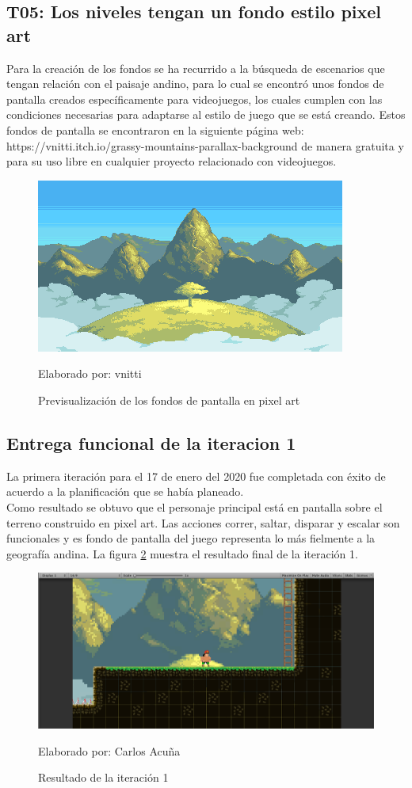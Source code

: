 \documentclass[a4paper, openright, 12pt]{report}
\begin{document}
\subsection*{T05: Los niveles tengan un fondo estilo pixel art}
\justify
Para la creación de los fondos se ha recurrido a la búsqueda de escenarios que tengan relación con el paisaje andino, para lo cual se encontró unos fondos de pantalla creados específicamente para videojuegos, los cuales cumplen con las condiciones necesarias para adaptarse al estilo de juego que se está creando.
Estos fondos de pantalla se encontraron en la siguiente página web: https://vnitti.itch.io/grassy-mountains-parallax-background de manera gratuita y para su uso libre en cualquier proyecto relacionado con videojuegos.

\begin{figure}[h]
\captionsetup{justification=centering,margin=2cm}
\includegraphics[scale=1]{T05_01}
\centering
\caption{Previsualización de los fondos de pantalla en pixel art}
Elaborado por: vnitti
\label{fig:T05_01}
\end{figure}

\subsection*{Entrega funcional de la iteracion 1}
\justify
La primera iteración para el 17 de enero del 2020 fue completada con éxito de acuerdo a la planificación que se había planeado.\\
Como resultado se obtuvo que el personaje principal está en pantalla sobre el terreno construido en pixel art. Las acciones correr, saltar, disparar y escalar son funcionales y es fondo de pantalla del juego representa lo más fielmente a la geografía andina. La figura \ref{fig:I01_01} muestra el resultado final de la iteración 1.

\begin{figure}[h]
\captionsetup{justification=centering,margin=2cm}
\includegraphics[scale=0.4]{I01_01}
\centering
\caption{Resultado de la iteración 1}
Elaborado por: Carlos Acuña
\label{fig:I01_01}
\end{figure}
\clearpage
\end{document}
